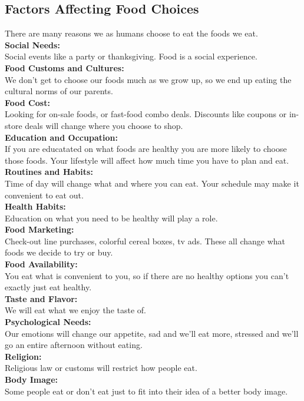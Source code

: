\documentclass[letterpaper, 11pt]{article}
\begin{document}
\subsection{Factors Affecting Food Choices}
\label{sec:orgea4aa3a}
There are many reasons we as humans choose to eat the foods we eat. \\
\textbf{Social Needs:}\\
Social events like a party or thanksgiving. Food is a social experience.\\
\textbf{Food Customs and Cultures:}\\
We don't get to choose our foods much as we grow up, so we end up eating the cultural norms of our parents.\\
\textbf{Food Cost:}\\
Looking for on-sale foods, or fast-food combo deals. Discounts like coupons or in-store deals will change where you choose to shop.\\
\textbf{Education and Occupation:}\\
If you are educatated on what foods are healthy you are more likely to choose those foods. Your lifestyle will affect how much time you have to plan and eat.\\
\textbf{Routines and Habits:}\\
Time of day will change what and where you can eat. Your schedule may make it convenient to eat out.\\
\textbf{Health Habits:}\\
Education on what you need to be healthy will play a role.\\
\textbf{Food Marketing:}\\
Check-out line purchases, colorful cereal boxes, tv ads. These all change what foods we decide to try or buy.\\
\textbf{Food Availability:}\\
You eat what is convenient to you, so if there are no healthy options you can't exactly just eat healthy.\\
\textbf{Taste and Flavor:}\\
We will eat what we enjoy the taste of.\\
\textbf{Psychological Needs:}\\
Our emotions will change our appetite, sad and we'll eat more, stressed and we'll go an entire afternoon without eating.\\
\textbf{Religion:}\\
Religious law or customs will restrict how people eat.\\
\textbf{Body Image:}\\
Some people eat or don't eat just to fit into their idea of a better body image.\\
\end{document}
